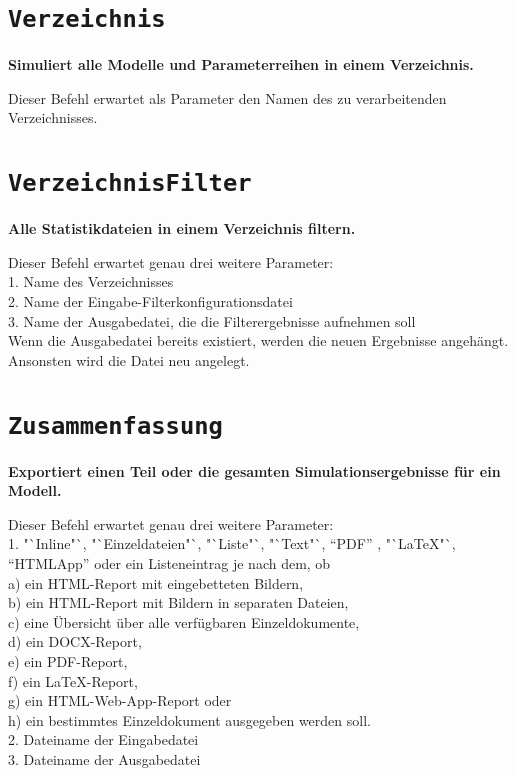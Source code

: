 \section{\texttt{Verzeichnis}}

\textbf{Simuliert alle Modelle und Parameterreihen in einem Verzeichnis.}

Dieser Befehl erwartet als Parameter den Namen des zu verarbeitenden Verzeichnisses.

\section{\texttt{VerzeichnisFilter}}

\textbf{Alle Statistikdateien in einem Verzeichnis filtern.}

Dieser Befehl erwartet genau drei weitere Parameter:\\
1. Name des Verzeichnisses\\
2. Name der Eingabe-Filterkonfigurationsdatei\\
3. Name der Ausgabedatei, die die Filterergebnisse aufnehmen soll\\
Wenn die Ausgabedatei bereits existiert, werden die neuen Ergebnisse angehängt.\\
Ansonsten wird die Datei neu angelegt.

\section{\texttt{Zusammenfassung}}

\textbf{Exportiert einen Teil oder die gesamten Simulationsergebnisse für ein Modell.}

Dieser Befehl erwartet genau drei weitere Parameter:\\
1. "`Inline"`, "`Einzeldateien"`, "`Liste"`, "`Text"`, "`PDF"' , "`LaTeX"`, "`HTMLApp"' oder ein Listeneintrag je nach dem, ob\\
a) ein HTML-Report mit eingebetteten Bildern,\\
b) ein HTML-Report mit Bildern in separaten Dateien,\\
c) eine Übersicht über alle verfügbaren Einzeldokumente,\\
d) ein DOCX-Report,\\
e) ein PDF-Report,\\
f) ein LaTeX-Report,\\
g) ein HTML-Web-App-Report oder\\
h) ein bestimmtes Einzeldokument ausgegeben werden soll.\\
2. Dateiname der Eingabedatei\\
3. Dateiname der Ausgabedatei

